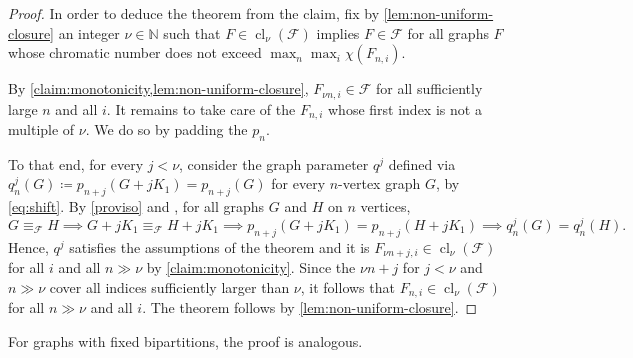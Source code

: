 \documentclass[11pt, DIV=15]{scrarticle}
\theoremstyle{definition}
\theoremstyle{plain}
\theoremstyle{remark}
\DeclareMathOperator{\cl}{cl}
\begin{document}
\begin{proof}
		In order to deduce the theorem from the claim,
		fix by \cref{lem:non-uniform-closure} an integer $\nu \in \mathbb{N}$ such that $F \in \cl_\nu(\mathcal{F}) $ implies $F \in \mathcal{F}$
		for all graphs $F$ whose chromatic number does not exceed $\max_n \max_i \chi(F_{n,i})$.
		
		By \cref{claim:monotonicity,lem:non-uniform-closure},
		$F_{\nu n,i} \in \mathcal{F}$ for all sufficiently large $n$ and all $i$.
		It remains to take care of the $F_{n,i}$ whose first index is not a multiple of $\nu$.
		We do so by padding the $p_n$.
		
		To that end, for every $j < \nu$, 
		consider the graph parameter $q^j$
		defined via $q_n^j(G) \coloneqq p_{n+j}(G + jK_1) = p_{n+j}(G)$ for every $n$-vertex graph $G$,
		by \cref{eq:shift}.
		By \cref{proviso} and \cite[Theorem~7]{seppelt_logical_2024},
		for all graphs $G$ and $H$ on $n$ vertices,
		\[
			G \equiv_{\mathcal{F}} H
			\implies G+jK_1 \equiv_{\mathcal{F}} H+ jK_1
			\implies p_{n+j}(G+jK_1) = p_{n+j}(H+jK_1)
			\implies q_n^j(G) = q_n^j(H).
		\]
		Hence, $q^j$ satisfies the assumptions of the theorem
		and it is $F_{\nu n+j, i} \in \cl_{\nu}(\mathcal{F})$ for all $i$ and
		all $n \gg \nu$ by \cref{claim:monotonicity}.
		Since the $\nu n + j$ for $j < \nu$ and $n \gg \nu$ cover all indices sufficiently larger than $\nu$,
		it follows that $F_{n,i} \in \cl_\nu(\mathcal{F})$ for all $n \gg \nu$ and all $i$.
		The theorem follows by \cref{lem:non-uniform-closure}.
	\end{proof}
	
	For graphs with fixed bipartitions, the proof is analogous.
	
\end{document}
